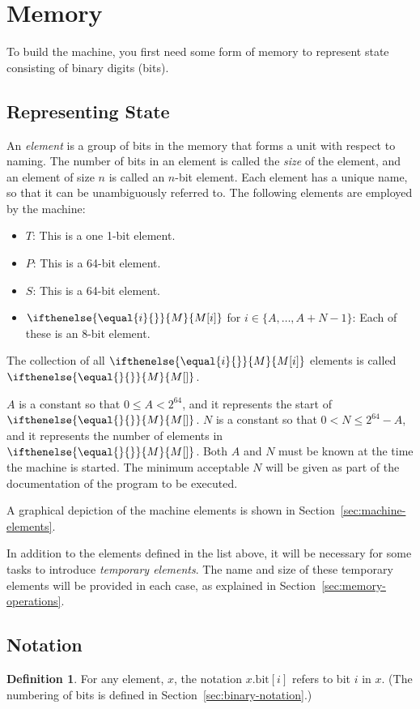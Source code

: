 \documentclass[a4paper,12pt]{article}
\newcommand{\MEM}[1]{\ifthenelse{\equal{#1}{}}{M}{M[#1]}}
\newcommand{\PC}{P}
\newcommand{\SP}{S}
\newcommand{\TERM}{T}
\newcommand{\bitno}[2]{#1.\mathrm{bit}[#2]}
\newcommand{\range}[2]{\{#1,\ldots,#2\}}
\theoremstyle{definition}
\newtheorem{definition}{Definition}
\begin{document}
\section{Memory}

To build the machine, you first need some form of memory to represent state consisting of binary digits (bits).

\subsection{Representing State}

An \emph{element} is a group of bits in the memory that forms a unit with respect to naming.
The number of bits in an element is called the \emph{size} of the element, and an element of size $n$ is called an $n$-bit element.
Each element has a unique name, so that it can be unambiguously referred to.
The following elements are employed by the machine:
\begin{itemize}
\item $\TERM$: This is a one 1-bit element.
\item $\PC$: This is a 64-bit element.
\item $\SP$: This is a 64-bit element.
\item $\MEM{i}$ for $i \in \range{A}{A+N-1}$: Each of these is an 8-bit element.
\end{itemize}
The collection of all $\MEM{i}$ elements is called $\MEM{}$.

$A$ is a constant so that $0 \le A < 2^{64}$, and it represents the start of $\MEM{}$.
$N$ is a constant so that $0 < N \le 2^{64}-A$, and it represents the number of elements in $\MEM{}$.
Both $A$ and $N$ must be known at the time the machine is started.
The minimum acceptable $N$ will be given as part of the documentation of the program to be executed.

A graphical depiction of the machine elements is shown in Section~\ref{sec:machine-elements}.

In addition to the elements defined in the list above, it will be necessary for some tasks to introduce \emph{temporary elements}.
The name and size of these temporary elements will be provided in each case, as explained in Section~\ref{sec:memory-operations}.

\subsection{Notation}

\begin{definition}
For any element, $x$, the notation $\bitno{x}{i}$ refers to bit $i$ in $x$. (The numbering of bits is defined in Section~\ref{sec:binary-notation}.)
\end{definition}
\end{document}
